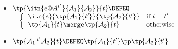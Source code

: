 \begin{definition}
{\begin{itemize}
\item[]     
$\tp{\itn{e@A^{t'}}{\mathcal A_1}{\mathcal A_2}}{t}
    \DEFEQ$
$\quad    \left\{ 
      \begin{array}{ll}
        \itn{e}{\tp{\mathcal A_1}{t'}}{\tp{\mathcal A_2}{t'}}
        &         
        \textrm{if}\ t=t'\\
        \tp{\mathcal A_1}{t}\merge\tp{\mathcal A_2}{t}
        & 
        \text{otherwise}
      \end{array}
    \right.
$\\


\item[] $\tp{\mathcal A_1 |^{t'}\mathcal A_2}{t} \DEFEQ
  \tp{\mathcal A_1}{t'}\pp\tp{\mathcal A_2}{t'} $\\




\end{itemize}}
\end{definition}
